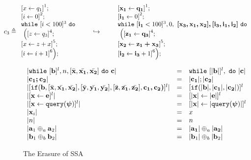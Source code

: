 \documentclass[a4paper,11pt]{article}
\begin{document}
{
\[
c_3 \triangleq
\begin{array}{l}
     \left[x \leftarrow q_1 \right]^1 ; \\
     \left[i \leftarrow 0 \right]^2 ; \\
    \ewhile ~  [i < 100]^3 ~ \edo
    \\
    ~ \Big( 
    \left[z \leftarrow q_3 \right]^4; \\
    \left[x \leftarrow z + x \right]^5; \\
    \left[i \leftarrow i + 1 \right]^6
    \Big) ;
\end{array}
%
\hspace{20pt} \hookrightarrow \hspace{20pt} 
%
\begin{array}{l}
     \left[\ssa{x_1} \leftarrow \ssa{q_1} \right]^1 ; \\
     \left[\ssa{i_1} \leftarrow 0 \right]^2 ; \\
    \ewhile
    ~ [\ssa{i_1} < 100]^3, 0,
    ~\ssa{[ x_3,x_1 ,x_2 ], [i_3, i_1, i_2] }~
    \edo \\
    ~ \Big( 
    \left[\ssa{z_1} \leftarrow \ssa{q_3} \right]^4; \\
    \left[ \ssa{x_2} \leftarrow \ssa{z_1 + x_3} \right]^5; \\
    \left[\ssa{i_2} \leftarrow \ssa{i_3} + 1 \right]^6
    \Big) ;
\end{array}
\]
}
%
\begin{figure}
   \[
 \begin{array}{lll}
    | \mathtt{while} ~ [ \boldsymbol{\mathbf{b}} ]^{l}, n, [\bar{\boldsymbol{\mathbf{x}}}, \bar{\boldsymbol{\mathbf{x_1}}}, \bar{\boldsymbol{\mathbf{x_2}}}] 
    ~ \mathtt{do} ~  \boldsymbol{\mathbf{c}}|  
    &=& \mathtt{while} ~ [|\boldsymbol{\mathbf{b}}|]^{l},  ~ \mathtt{do} ~ |\boldsymbol{\mathbf{c}}| 
	\\
    |\boldsymbol{\mathbf{c_1 ; c_2}}|  &=& |\boldsymbol{\mathbf{c_1}}| ; |\boldsymbol{\mathbf{c_2}}| 
    \\
    |[\mathtt{if}(\boldsymbol{\mathbf{b}},
    [ \bar{\boldsymbol{\mathbf{x}}}, \bar{\boldsymbol{\mathbf{x_1}}}, \bar{\boldsymbol{\mathbf{x_2}}}] ,
    [ \bar{\boldsymbol{\mathbf{y}}}, \bar{\boldsymbol{\mathbf{y_1}}}, \bar{\boldsymbol{\mathbf{y_2}}}] , 
    [\bar{\boldsymbol{\mathbf{z}}}, \bar{\boldsymbol{\mathbf{z_1}}}, \bar{\boldsymbol{\mathbf{z_2}}}] , 
    \boldsymbol{\mathbf{ c_1, c_2)}}]^{l}|  
    &=&
    [\mathtt{if}(|\boldsymbol{\mathbf{b}}|, |\boldsymbol{\mathbf{ c_1}}|, |\boldsymbol{\mathbf{c_2}}|)]^{l}
    \\
    | [\mathrel{ \boldsymbol{\mathbf{x}} \leftarrow \boldsymbol{\mathbf{e}} }]^{l}| & = & [\mathrel{ |\boldsymbol{\mathbf{x}}| \leftarrow |\boldsymbol{\mathbf{e}}| } ]^{l}
    \\
    | [\mathrel{ \boldsymbol{\mathbf{x}} \leftarrow {\tt query}(\boldsymbol{\mathbf{\psi}}) } ]^{l} | & = & [\mathrel{ |\boldsymbol{\mathbf{x}}| \leftarrow |{\tt query}(\boldsymbol{\mathbf{\psi}})| }]^{l}
    \\
    |\boldsymbol{\mathbf{x}}_i| & = & x 
    \\
    |n | & = & n 
    \\
    | \boldsymbol{\mathbf{a}}_1 \oplus_{a} \boldsymbol{\mathbf{a}}_2 | & = &  |\boldsymbol{\mathbf{a_1}}| \oplus_a |\boldsymbol{\mathbf{a_2}}| \\
    | \boldsymbol{\mathbf{b}}_1 \oplus_{b} \boldsymbol{\mathbf{b}}_2 | & = &  |\boldsymbol{\mathbf{b}}_1| \oplus_b |\boldsymbol{\mathbf{b}}_2|
 \end{array}
\]
    \caption{The Erasure of SSA}
    \label{fig:ssa_erasure-while}
\end{figure}
%
%
%
\end{document}
